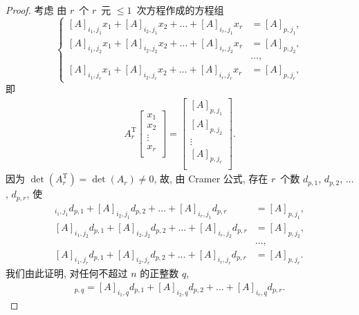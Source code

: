 \documentclass[../libro.tex]{subfiles}
\begin{document}
\begin{proof}
    考虑%
    由 \(r\)~个 \(r\)~元 \({\leq} 1\)~次方程作成的方程组
    \begin{equation*}
        \left\{ %
        \begin{aligned}
            [A]_{i_1,j_1} x_1 + [A]_{i_2,j_1} x_2 + \dots + [A]_{i_r,j_1} x_r & = [A]_{p,j_1}, \\
            [A]_{i_1,j_2} x_1 + [A]_{i_2,j_2} x_2 + \dots + [A]_{i_r,j_2} x_r & = [A]_{p,j_2}, \\
            & \dots, \\
            [A]_{i_1,j_r} x_1 + [A]_{i_2,j_r} x_2 + \dots + [A]_{i_r,j_r} x_r & = [A]_{p,j_r},
        \end{aligned}
        \right. %
    \end{equation*}
    即
    \begin{align*}
        A_r^{\mathrm{T}}
        \begin{bmatrix}
            x_1    \\
            x_2    \\
            \vdots \\
            x_r    \\
        \end{bmatrix}
        =
        \begin{bmatrix}
            [A]_{p,j_1} \\
            [A]_{p,j_2} \\
            \vdots      \\
            [A]_{p,j_r} \\
        \end{bmatrix}.
    \end{align*}
    因为
    \(\det {(A_r^{\mathrm{T}})}
    = \det {(A_r)} \neq 0\),
    故, 由 Cramer 公式,
    存在 \(r\)~个数
    \(d_{p,1}\), \(d_{p,2}\), \(\dots\), \(d_{p,r}\),
    使
    \begin{align*}
        [A]_{i_1,j_1} d_{p,1} + [A]_{i_2,j_1} d_{p,2} + \dots + [A]_{i_r,j_1} d_{p,r} & = [A]_{p,j_1}, \\
        [A]_{i_1,j_2} d_{p,1} + [A]_{i_2,j_2} d_{p,2} + \dots + [A]_{i_r,j_2} d_{p,r} & = [A]_{p,j_2}, \\
        & \dots, \\
        [A]_{i_1,j_r} d_{p,1} + [A]_{i_2,j_r} d_{p,2} + \dots + [A]_{i_r,j_r} d_{p,r} & = [A]_{p,j_r}.
    \end{align*}
    我们由此证明, 对任何不超过 \(n\) 的正整数 \(q\),
    \begin{align*}
        [A]_{p,q} =
        [A]_{i_1,q} d_{p,1}
        + [A]_{i_2,q} d_{p,2}
        + \dots
        + [A]_{i_r,q} d_{p,r}.
    \end{align*}


\end{proof}
\end{document}
